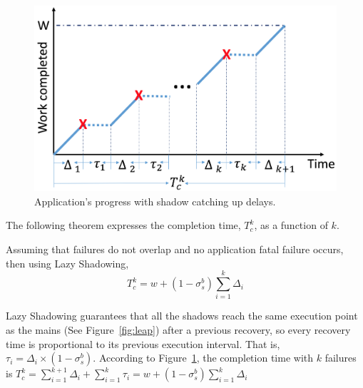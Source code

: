 \begin{figure}[!t]
	\begin{center}
		\includegraphics[width=0.7\columnwidth]{Figures/progress}
	\end{center}
	\caption{Application's progress with shadow catching up delays.}
	\label{fig:progress}
\end{figure}

The following theorem expresses the completion time, $T_c^k$, as a function of $k$.

\begin{theorem}
Assuming that failures do not overlap and no application fatal failure occurs, then using Lazy Shadowing, 
	$$T_c^k = w + (1-\sigma_s^b)\sum_{i=1}^k\Delta_i$$
\end{theorem}
\begin{IEEEproof}
Lazy Shadowing guarantees that all the shadows reach the same execution point as the mains (See Figure~\ref{fig:leap}) after a previous recovery, so every recovery time is proportional to its previous execution interval. %
That is, $\tau_i = \Delta_i \times (1 - \sigma_s^b)$. %
According to Figure~\ref{fig:progress}, the completion time with $k$ failures is 
	$T_c^k = \sum_{i=1}^{k+1}\Delta_i + \sum_{i=1}^k\tau_i = w + (1-\sigma_s^b)\sum_{i=1}^k\Delta_i$
\end{IEEEproof}

